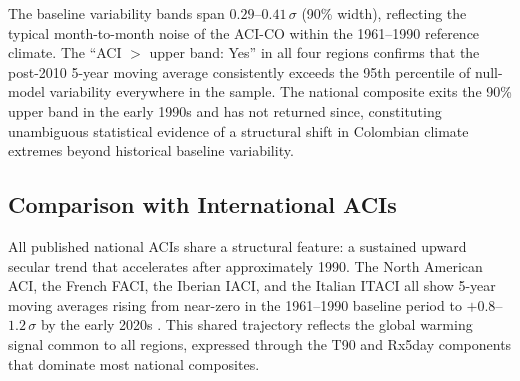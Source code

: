 \documentclass[12pt]{article}
\begin{document}
\medskip
\begin{table}[H]
\centering\small
\renewcommand{\arraystretch}{1.2}
\setlength{\tabcolsep}{6pt}
\caption{Baseline variability band widths for the ACI-CO composite 5-year moving average, by region ($B=200$ replicates, block length $L=12$ months, resampled from 1961--1990 only). ``90\% band'' is the mean width (95th minus 5th percentile) in $\sigma$ units over the stated period. ``ACI $>$ upper band'' indicates whether the post-2010 5-year MA consistently exceeds the 95th percentile null-model envelope.}
\label{tab:boot_widths}
\end{table}
\medskip
\noindent The baseline variability bands span $0.29$--$0.41\,\sigma$ (90\% width), reflecting the typical month-to-month noise of the ACI-CO within the 1961--1990 reference climate. The ``ACI $>$ upper band: Yes'' in all four regions confirms that the post-2010 5-year moving average consistently exceeds the 95th percentile of null-model variability everywhere in the sample. The national composite exits the 90\% upper band in the early 1990s and has not returned since, constituting unambiguous statistical evidence of a structural shift in Colombian climate extremes beyond historical baseline variability.
 
\subsection{Comparison with International ACIs}
 
All published national ACIs share a structural feature: a sustained upward secular trend that accelerates after approximately 1990. The North American ACI, the French FACI, the Iberian IACI, and the Italian ITACI all show 5-year moving averages rising from near-zero in the 1961--1990 baseline period to $+0.8$--$1.2\,\sigma$ by the early 2020s \citep{aci2016,garrido2023faci,zhou2023iaci,rogo2025}. This shared trajectory reflects the global warming signal common to all regions, expressed through the T90 and Rx5day components that dominate most national composites.
\end{document}
